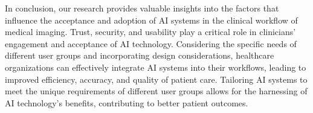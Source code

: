 In conclusion, our research provides valuable insights into the factors that influence the acceptance and adoption of \ac{AI} systems in the clinical workflow of medical imaging.
Trust, security, and usability play a critical role in clinicians' engagement and acceptance of \ac{AI} technology.
Considering the specific needs of different user groups and incorporating design considerations, healthcare organizations can effectively integrate \ac{AI} systems into their workflows, leading to improved efficiency, accuracy, and quality of patient care.
Tailoring \ac{AI} systems to meet the unique requirements of different user groups allows for the harnessing of \ac{AI} technology's benefits, contributing to better patient outcomes.